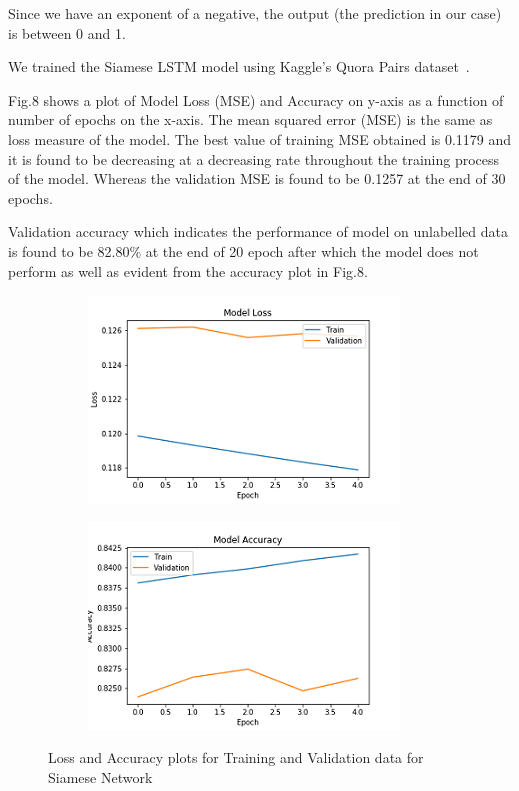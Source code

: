 \documentclass[runningheads]{llncs}
\begin{document}
	Since we have an exponent of a negative, the output (the prediction in our case) is between 0 and 1.
	
	We trained the Siamese LSTM model using Kaggle's Quora Pairs dataset~\cite{ref_url25}. 	
	
	Fig.8 shows a plot of Model Loss (MSE) and Accuracy on y-axis as a function of number of epochs on the x-axis.
	The mean squared error (MSE) is the same as loss measure of the model. The best value of training MSE obtained is 0.1179 and it is found to be decreasing at a decreasing rate throughout the training process of the model. Whereas the validation MSE is found to be 0.1257 at the end of 30 epochs.
	
	Validation accuracy which indicates the performance of model on unlabelled data is found to be 82.80\% at the end of 20 epoch after which the model does not perform as well as evident from the accuracy plot in Fig.8.
	
	\begin{figure}[H]
		\begin{subfigure}[b]{0.51\textwidth}
			\includegraphics[width=\textwidth]{siamese_eng_loss.png}
			\label{fig:Model Loss}
		\end{subfigure}
		\hfill
		\begin{subfigure}[b]{0.51\textwidth}
			\includegraphics[width=\textwidth]{siamese_eng_acc.png}
			\label{fig:Model Accuracy}
		\end{subfigure}
		\caption{Loss and Accuracy plots for Training and Validation data for Siamese Network}
	\end{figure}
	
\end{document}
